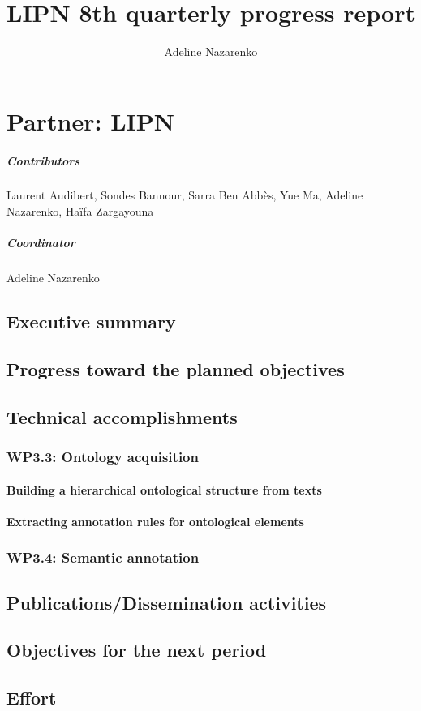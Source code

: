 \documentclass{report}
\author{Adeline Nazarenko}
\title{LIPN 8th quarterly progress report}
\begin{document}
\maketitle
\tableofcontents

\chapter{Partner: LIPN}

\paragraph{Contributors}
Laurent Audibert, Sondes Bannour, Sarra Ben Abb\`es, Yue Ma, Adeline Nazarenko, Ha\"ifa Zargayouna

\paragraph{Coordinator}
Adeline Nazarenko

\section{Executive summary}


\section{Progress toward the planned objectives}


\section{Technical accomplishments}

\subsection{WP3.3: Ontology acquisition}

\subsubsection*{Building a hierarchical ontological structure from texts}

\subsubsection*{Extracting annotation rules for ontological elements}

\subsection{WP3.4: Semantic annotation}




\section{Publications/Dissemination activities}


\section{Objectives for the next period} 

\section{Effort}
\end{document}
